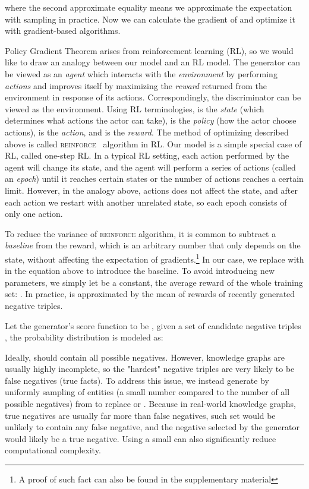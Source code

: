\documentclass[11pt,a4paper]{article}
\begin{document}
where the second approximate equality means we approximate the expectation with sampling in practice. Now we can calculate the gradient of  and optimize it with gradient-based algorithms.

Policy Gradient Theorem arises from reinforcement learning (RL), so we would like to draw an analogy between our model and an RL model. The generator can be viewed as an \emph{agent} which interacts with the \emph{environment} by performing \emph{actions} and improves itself by maximizing the \emph{reward} returned from the environment in response of its actions. Correspondingly, the discriminator can be viewed as the environment. Using RL terminologies,  is the \emph{state} (which determines what actions the actor can take),  is the \emph{policy} (how the actor choose actions),  is the \emph{action}, and  is the \emph{reward}. The method of optimizing  described above is called \textsc{reinforce}~\cite{williams1992simple} algorithm in RL. Our model is a simple special case of RL, called one-step RL. In a typical RL setting, each action performed by the agent will change its state, and the agent will perform a series of actions (called an \emph{epoch}) until it reaches certain states or the number of actions reaches a certain limit. However, in the analogy above, actions does not affect the state, and after each action we restart with another unrelated state, so each epoch consists of only one action.

To reduce the variance of \textsc{reinforce} algorithm, it is common to subtract a \emph{baseline} from the reward, which is an arbitrary number that only depends on the state, without affecting the expectation of gradients.\footnote{A proof of such fact can also be found in the supplementary material} In our case, we replace  with  in the equation above to introduce the baseline. To avoid introducing new parameters, we simply let  be a constant, the average reward of the whole training set: . In practice,  is approximated by the mean of rewards of recently generated negative triples.

Let the generator's score function to be , given a set of candidate negative triples , the probability distribution  is modeled as:


Ideally,  should contain all possible negatives. However, knowledge graphs are usually highly incomplete, so the "hardest" negative triples are very likely to be false negatives (true facts). To address this issue, we instead generate  by uniformly sampling of  entities (a small number compared to the number of all possible negatives) from  to replace  or . Because in real-world knowledge graphs, true negatives are usually far more than false negatives, such set would be unlikely to contain any false negative, and the negative selected by the generator would likely be a true negative. Using a small  can also significantly reduce computational complexity.
\end{document}
